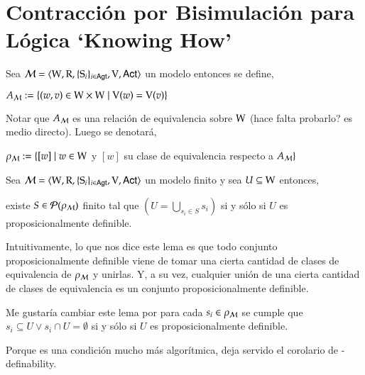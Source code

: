 \chapter{Contracción por Bisimulación para Lógica `Knowing How'}

\begin{definicion}
    Sea $\mathcal{M}=\langle \mathrm{W},\mathrm{R},\{ \mathrm{S}_i \}_{i \in {\rm \sf Agt}},\mathrm{V},{\rm \sf Act} \rangle$ un modelo entonces se define, 
    \begin{center}
        $A_{\mathcal{M}} := \{(w,v) \in \mathrm{W} \times \mathrm{W} \mid \mathrm{V}(w) = \mathrm{V}(v)\}$
    \end{center}
    Notar que $A_{\mathcal{M}}$ es una relación de equivalencia sobre $\mathrm{W}$ (hace falta probarlo? es medio directo). Luego se denotará,
    \begin{center}
        $\rho_{\mathcal{M}} := \{ [w] \mid w \in \mathrm{W} $ y $[w]$ su clase de equivalencia respecto a $A_{\mathcal{M}}\}$
    \end{center}
\end{definicion}


\begin{lema}
    Sea $\mathcal{M}=\langle \mathrm{W},\mathrm{R},\{ \mathrm{S}_i \}_{i \in {\rm \sf Agt}},\mathrm{V},{\rm \sf Act} \rangle$ un modelo finito y sea $U \subseteq \mathrm{W}$ entonces,
    \begin{center}

    existe $S \in \mathcal{P}(\rho_{\mathcal{M}})$ finito tal que  $(U = \bigcup\limits_{s_i \in S} s_{i})$ \quad si y sólo si \quad $U$ es proposicionalmente definible. 
    \end{center}
\end{lema}

Intuitivamente, lo que nos dice este lema es que todo conjunto proposicionalmente definible viene de tomar una cierta cantidad de clases de equivalencia de $\rho_{\mathcal{M}}$ y unirlas. Y, a su vez, cualquier unión de una cierta cantidad de clases de equivalencia es un conjunto proposicionalmente definible. 

Me gustaría cambiar este lema por para cada $s_i \in \rho_{\mathcal{M}}$ se cumple que $s_i \subseteq U \vee s_i \cap U = \emptyset$ si y sólo si $U$ es proposicionalmente definible.

Porque es una condición mucho más algorítmica, deja servido el corolario de \KHilogic-definability.



